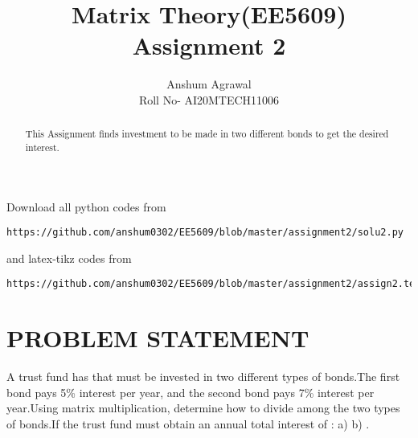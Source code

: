 \documentclass[journal,12pt,twocolumn]{IEEEtran}
\begin{document}
\makeatletter
{}
\makeatother
\let\StandardTheFigure\thefigure
\let\vec\mathbf
\renewcommand{\thefigure}{\theproblem}
\def\putbox#1#2#3{\makebox[0in][l]{\makebox[#1][l]{}\raisebox{\baselineskip}[0in][0in]{\raisebox{#2}[0in][0in]{#3}}}}
     \def\rightbox#1{\makebox[0in][r]{#1}}
     \def\centbox#1{\makebox[0in]{#1}}
     \def\topbox#1{\raisebox{-\baselineskip}[0in][0in]{#1}}
     \def\midbox#1{\raisebox{-0.5\baselineskip}[0in][0in]{#1}}
\vspace{3cm}
\title{Matrix Theory(EE5609) Assignment 2}
\author{Anshum Agrawal \\ Roll No- AI20MTECH11006}
%
\maketitle
\newpage
\bigskip
\renewcommand{\thefigure}{\theenumi}
\renewcommand{\thetable}{\theenumi}
\begin{abstract}
  This Assignment finds investment to be made in two different bonds to get the desired interest.
\end{abstract}
Download all python codes from 
%
\begin{lstlisting}
https://github.com/anshum0302/EE5609/blob/master/assignment2/solu2.py
\end{lstlisting}
%
and latex-tikz codes from 
%
\begin{lstlisting}
https://github.com/anshum0302/EE5609/blob/master/assignment2/assign2.tex
\end{lstlisting}
%
\section{\textbf{PROBLEM STATEMENT}}
A trust fund has  that must be invested in two different types of bonds.The first bond pays 5\% interest per year, and the second bond pays 7\% interest per year.Using matrix multiplication, determine how to divide  among the two types of bonds.If the trust fund must obtain an annual total interest of : a)  b) .
\end{document}
